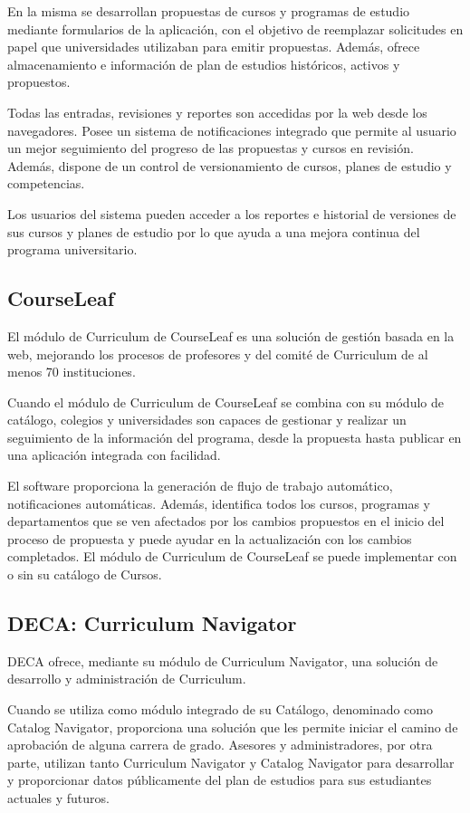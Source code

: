 En la misma se desarrollan propuestas de cursos y programas de estudio mediante formularios de la aplicación, con el objetivo de reemplazar solicitudes en papel que universidades utilizaban para emitir propuestas. Además, ofrece almacenamiento e información de plan de estudios históricos, activos y propuestos.

Todas las entradas, revisiones y reportes son accedidas por la web desde los navegadores. Posee un sistema de notificaciones integrado que permite al usuario un mejor seguimiento del progreso de las propuestas y cursos en revisión. Además, dispone de un control de versionamiento de cursos, planes de estudio y competencias.

Los usuarios del sistema pueden acceder a los reportes e historial de versiones de sus cursos y planes de estudio por lo que ayuda a una mejora continua del programa universitario.

\subsection{CourseLeaf}
El módulo de Curriculum de CourseLeaf es una solución de gestión basada en la web, mejorando los procesos de profesores y del comité de Curriculum de al menos 70 instituciones\citep{courseleaf_webpage}.

Cuando el módulo de Curriculum de CourseLeaf se combina con su módulo de catálogo, colegios y universidades son capaces de gestionar y realizar un seguimiento de la información del programa, desde la propuesta hasta publicar en una aplicación integrada con facilidad.

El software proporciona la generación de flujo de trabajo automático, notificaciones automáticas. Además, identifica todos los cursos, programas y departamentos que se ven afectados por los cambios propuestos en el inicio del proceso de propuesta y puede ayudar en la actualización con los cambios completados. El módulo de Curriculum de CourseLeaf se puede implementar con o sin su catálogo de Cursos.

\subsection{DECA: Curriculum Navigator}
DECA ofrece, mediante su módulo de Curriculum Navigator, una solución de desarrollo y administración de Curriculum\citep{deca_webpage}.

Cuando se utiliza como módulo integrado de su Catálogo, denominado como Catalog Navigator, proporciona una solución que les permite iniciar el camino de aprobación de alguna carrera de grado. Asesores y administradores, por otra parte, utilizan tanto Curriculum Navigator y Catalog Navigator para desarrollar y proporcionar datos públicamente del plan de estudios para sus estudiantes actuales y futuros.

